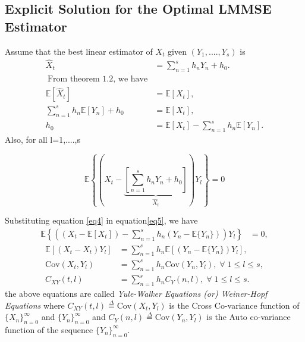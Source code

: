 \documentclass[a4paper,english,12pt]{article}
\begin{document}
\subsection{Explicit Solution for the Optimal LMMSE \\ Estimator}
Assume that the best linear estimator of $X_t$ given $(Y_1,....,Y_s)$ is
 \begin{align}
  \hat{X}_t&=\sum_{n=1}^s h_nY_n+h_0.\\\
\text{From theorem 1.2, we have}\nonumber \\
    \mathbb{E}[\hat{X}_{t}]&=\mathbb{E}[X_{t}],\nonumber\\
  \sum_{n=1}^{s}{h_n\mathbb{E}[Y_n]}+h_0&=\mathbb{E}[X_{t}], \nonumber\\
h_0&=\mathbb{E}[X_t]-
 \sum_{n=1}^{s}{h_n\mathbb{E}[Y_{n}]}.\label{eq4}  
 \end{align}
 Also, for all \; l=1,....,s  
 \begin{center}\begin{equation}
  \mathbb{E}\left\lbrace\left(X_{t}-\underbrace{\left[\sum_{n=1}^{s}{h_nY_n}+h_0\right]}_{\hat{X}_t}\right)Y_l\right\rbrace = 0\label{eq5}
 \end{equation}  \end{center}
    Substituting equation \eqref{eq4} in equation\eqref{eq5}, we have
 \begin{align}
\mathbb{E}\left\lbrace\left((X_{t}-\mathbb{E}[X_t])-\sum_{n=1}^{s}h_n(Y_n-\mathbb{E}\lbrace Y_n \rbrace)\right)Y_l\right\rbrace&=0, 
\end{align}
\begin{align}
\mathbb{E}[(X_{t}-X_t)Y_l]&=
\sum_{n=1}^{s}h_n\mathbb{E}\left[\left(Y_n-\mathbb{E}\lbrace Y_n \rbrace\right)Y_l\right], \nonumber \\
\text{Cov}(X_t,Y_l)&=\sum_{n=1}^{s} h_n\text{Cov}(Y_n,Y_l), \; \forall\; 1\leq l \leq s, \nonumber\\
C_{XY}(t,l)&=\sum_{n=1}^{s} h_nC_Y(n,l), \; \forall \; 1\leq l
\leq s.
\end{align}
the above equations are called \textit{Yule-Walker Equations (or) Weiner-Hopf Equations}
where
$C_{XY}(t,l) \overset{\Delta}{=} \text{Cov}(X_t,Y_l)$ is the Cross Co-variance function of 
$\{ X_n \}_{n=0}^{\infty}$ and $\{ Y_n \}_{n=0}^{\infty} $ and  $C_Y(n,l)\overset{\Delta}{=} \text{Cov}(Y_n,Y_l)$ is the Auto co-variance function of the sequence  $\{ Y_n \}_{n=0}^{\infty} $.\\
\end{document}
